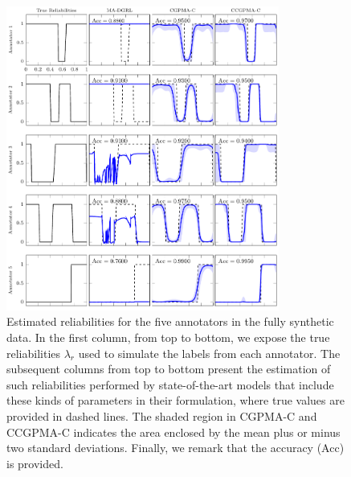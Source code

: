 \documentclass[journal]{IEEEtran}
\begin{document}
\begin{figure}[!tb]
	\centering
	\includegraphics[width = 0.8\textwidth]{Figures/VarEXpC.pdf}
	\caption{Estimated reliabilities for the five annotators in the fully synthetic data. In the first column, from top to bottom, we expose the true reliabilities $\lambda_r$ used to simulate the labels from each annotator. The subsequent columns from top to bottom present the estimation of such reliabilities performed by state-of-the-art models that include these kinds of parameters in their formulation, where true values are provided in dashed lines. The shaded region in CGPMA-C and CCGPMA-C indicates the area enclosed by the mean plus or minus two standard deviations. Finally, we remark that the accuracy (Acc) is provided.}
	\label{fig:ExpCla}
\end{figure}
\end{document}
